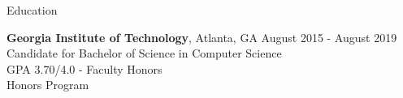 \documentclass{resume} %
\begin{document}
\begin{rSection}{Education}

  \textbf{Georgia Institute of Technology}, Atlanta, GA \hfill {August 2015 - August 2019}
  \\ Candidate for Bachelor of Science in Computer Science
  \\ GPA 3.70/4.0 - Faculty Honors
  \\ Honors Program

\end{rSection}

\end{document}
